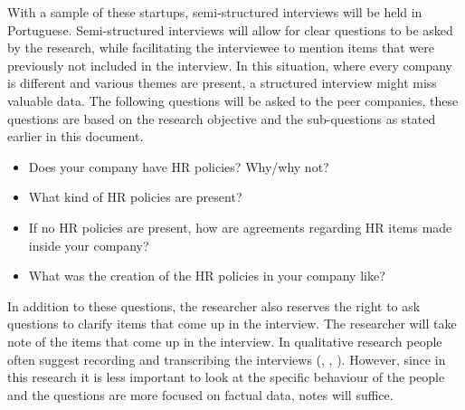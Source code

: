 \documentclass[man]{apa6}
\begin{document}
With a sample of these startups, semi-structured interviews will be held in Portuguese. Semi-structured interviews will allow for clear questions to be asked by the research, while facilitating the interviewee to mention items that were previously not included in the interview. In this situation, where every company is different and various themes are present, a structured interview might miss valuable data. The following questions will be asked to the peer companies, these questions are based on the research objective and the sub-questions as stated earlier in this document.
\begin{itemize}
\item Does your company have HR policies? Why/why not?
\item What kind of HR policies are present?
\item If no HR policies are present, how are agreements regarding HR items made inside your company?
\item What was the creation of the HR policies in your company like?
\end{itemize}

In addition to these questions, the researcher also reserves the right to ask questions to clarify items that come up in the interview. The researcher will take note of the items that come up in the interview. In qualitative research people often suggest recording and transcribing the interviews (\parencite{HUMBLE}, \parencite{BAILEY2008}, \parencite{THOMSON2014}). However, since in this research it is less important to look at the specific behaviour of the people and the questions are more focused on factual data, notes will suffice.
\end{document}

